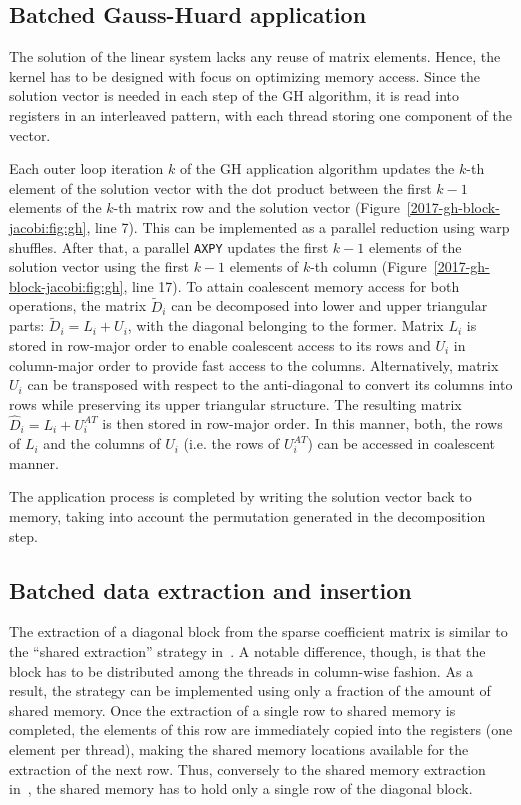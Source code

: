 \subsection{Batched Gauss-Huard application}
The solution of the linear system lacks any reuse of matrix elements.
Hence,
the kernel has to be designed with focus on optimizing memory access.
Since the solution vector is needed in each step of the GH algorithm, it is read into registers
in an interleaved pattern, with each thread storing one component of the vector.

Each outer loop iteration $k$ of the GH application algorithm
updates the $k$-th element of the solution vector
with the dot product between the first $k-1$ elements of the $k$-th matrix row
and the solution vector (Figure~\ref{2017-gh-block-jacobi:fig:gh}, line 7).
This can be implemented as a parallel reduction using warp shuffles.
After that, a parallel \texttt{AXPY} updates the first $k-1$ elements of the solution vector using
the first $k-1$ elements of $k$-th column (Figure~\ref{2017-gh-block-jacobi:fig:gh}, line 17).
To attain coalescent memory access for both operations,
the matrix $\widetilde{D}_i$ can be decomposed into lower and upper triangular parts: $\widetilde{D}_i = L_i + U_i$,
with the diagonal belonging to the former.
Matrix $L_i$ is stored in row-major order to enable coalescent access to its rows
and $U_i$ in column-major order to provide fast access to the columns.
Alternatively,
matrix $U_i$ can be transposed with respect to the anti-diagonal
to convert its columns into rows while preserving its upper triangular structure.
The resulting matrix $\hat{D}_i = L_i^{} + U_i^{AT}$ is then stored in row-major order.
In this manner, both, the rows of $L_i$ and the columns of $U_i$ (i.e. the rows of $U_i^{AT}$)
can be accessed in coalescent manner.
 
The application process is completed by writing the solution vector back to memory,
taking into account the permutation generated in the decomposition step.

\subsection{Batched data extraction and insertion}
The extraction of a diagonal block from the sparse coefficient matrix is similar to the
``shared extraction'' strategy in~\cite{gje}.
A notable difference, though, is that the block has to be distributed among the threads in column-wise fashion.
As a result, the strategy can be implemented using only a fraction of the amount of shared memory.
Once the extraction of a single row to shared memory is completed,
the elements of this row are immediately copied into the registers (one element per thread),
making the shared memory locations available for the extraction of the next row.
Thus, conversely to the shared memory extraction in~\cite{gje}, 
the shared memory has to hold only a single row of the diagonal block.

